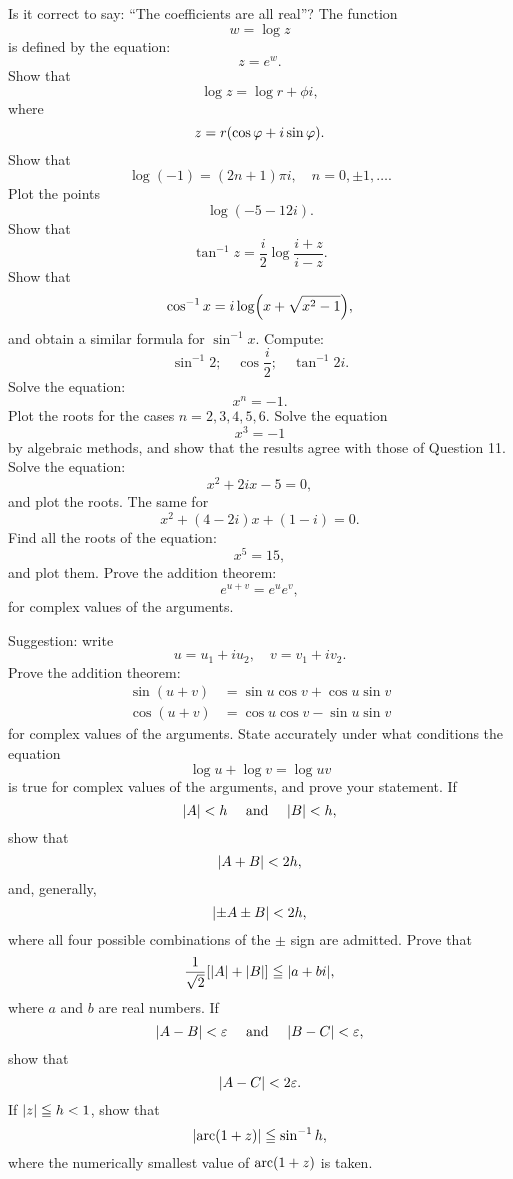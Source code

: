 	Is it correct to say: ``The coefficients are all real''?
\problem The function
	\[
	w=\log z
	\] is defined by the equation:
	\[
	z=e^{w}
	.\] Show that
	\[
	\log z=\log r+\phi i
,\] where 
\[
	z=r\pbr*{\cos \phi +i\sin \phi }
.\]
\problem Show that
	\[
		\log (-1)=(2n+1)\pi i, \quad n=0, \pm 1, \dots 
	.\] 
\problem Plot the points
	\[
		\log (-5-12i)
	.\] 
\problem Show that
	\[
	\tan ^{-1}z=\frac{i}{2}\log \frac{i+z}{i-z} 
	.\] 
\problem Show that
	\[
		\cos ^{-1}x=i\log \pbr*{x+\sqrt{x^2-1} } 
	,\] and obtain a similar formula for $\sin ^{-1}x$.
\problem Compute:
	\[
	\sin ^{-1}2; \quad \cos \frac{i}{2}; \quad \tan ^{-1}2i
	.\] 
\problem Solve the equation:
	\[
	x^n=-1
	.\] Plot the roots for the cases $n=2,3,4,5,6$.
\problem Solve the equation
	\[
	x^3=-1
	\] by algebraic methods, and show that the results agree with those of Question 11.
\problem Solve the equation:
	\[
	x^2+2ix-5=0
	,\] and plot the roots.
\problem The same for
	\[
		x^2+(4-2i)x+(1-i)=0
	.\] 
\problem Find all the roots of the equation:
	\[
	x^5=15
	,\] and plot them.
\problem Prove the addition theorem:
	\[
	e^{u+v}=e^{u}e^{v}
	,\] for complex values of the arguments.

	Suggestion: write
	\[
	u=u_1+iu_2, \quad v=v_1+iv_2
	.\] 
\problem Prove the addition theorem:
	\begin{align*}
		\sin (u+v)&=\sin u\cos v+\cos u\sin v\\
		\cos (u+v)&=\cos u\cos v-\sin u\sin v
	\end{align*} for complex values of the arguments.
\problem State accurately under what conditions the equation
	\[
	\log u+\log v=\log uv
	\] is true for complex values of the arguments, and prove your statement.
\problem If
	\[
	\abs*{A} <h \quad \text{ and } \quad \abs*{B} <h
	,\] show that
	\[
	\abs*{A+B} <2h
	,\] and, generally,
	\[
	\abs*{\pm A\pm B} <2h
	,\] where all four possible combinations of the $\pm$ sign are admitted.
\problem Prove that
	\[
		\frac{1}{\sqrt{2} } \sbr*{\abs*{A} +\abs*{B} } \le \abs*{a+bi} 
	,\] where $a$ and $b$ are real numbers.
\problem If
	\[
	\abs*{A-B} <\epsilon \quad \text{ and } \quad \abs*{B-C} <\epsilon
	,\] show that
	 \[
	\abs*{A-C} <2\epsilon
	.\] 
\problem If $\abs*{z} \le h <1$, show that
	\[
		\abs*{\Arc (1+z)} \le \sin ^{-1}h
	,\] where the numerically smallest value of $\Arc (1+z)$ is taken. 

